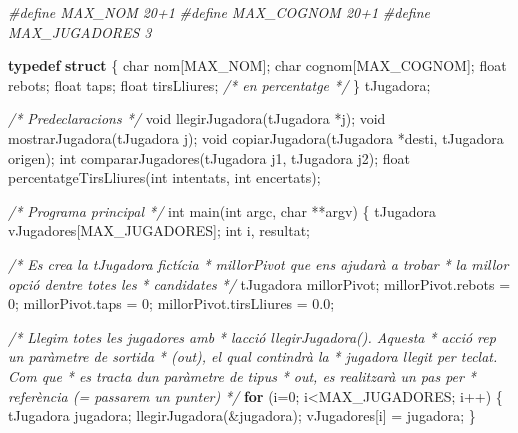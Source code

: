 \documentclass[]{book}
\newenvironment{Shaded}{\begin{snugshade}}{\end{snugshade}}
\newcommand{\CommentTok}[1]{\textcolor[rgb]{0.56,0.35,0.01}{\textit{#1}}}
\newcommand{\ControlFlowTok}[1]{\textcolor[rgb]{0.13,0.29,0.53}{\textbf{#1}}}
\newcommand{\DataTypeTok}[1]{\textcolor[rgb]{0.13,0.29,0.53}{#1}}
\newcommand{\DecValTok}[1]{\textcolor[rgb]{0.00,0.00,0.81}{#1}}
\newcommand{\FloatTok}[1]{\textcolor[rgb]{0.00,0.00,0.81}{#1}}
\newcommand{\KeywordTok}[1]{\textcolor[rgb]{0.13,0.29,0.53}{\textbf{#1}}}
\newcommand{\NormalTok}[1]{#1}
\newcommand{\PreprocessorTok}[1]{\textcolor[rgb]{0.56,0.35,0.01}{\textit{#1}}}
\begin{document}
\begin{Shaded}
\begin{Highlighting}[]
\PreprocessorTok{\#define MAX\_NOM 20+1}
\PreprocessorTok{\#define MAX\_COGNOM 20+1}
\PreprocessorTok{\#define MAX\_JUGADORES 3}

\KeywordTok{typedef} \KeywordTok{struct}\NormalTok{ \{}
    \DataTypeTok{char}\NormalTok{ nom[MAX\_NOM];}
    \DataTypeTok{char}\NormalTok{ cognom[MAX\_COGNOM];}
    \DataTypeTok{float}\NormalTok{ rebots;}
    \DataTypeTok{float}\NormalTok{ taps;}
    \DataTypeTok{float}\NormalTok{ tirsLliures; }\CommentTok{/* en percentatge */}
\NormalTok{\} tJugadora;}

\CommentTok{/* Predeclaracions */}
\DataTypeTok{void}\NormalTok{ llegirJugadora(tJugadora *j);}
\DataTypeTok{void}\NormalTok{ mostrarJugadora(tJugadora j);}
\DataTypeTok{void}\NormalTok{ copiarJugadora(tJugadora *desti, tJugadora origen);}
\DataTypeTok{int}\NormalTok{ compararJugadores(tJugadora j1, tJugadora j2);}
\DataTypeTok{float}\NormalTok{ percentatgeTirsLliures(}\DataTypeTok{int}\NormalTok{ intentats, }\DataTypeTok{int}\NormalTok{ encertats);}

\CommentTok{/* Programa principal */}
\DataTypeTok{int}\NormalTok{ main(}\DataTypeTok{int}\NormalTok{ argc, }\DataTypeTok{char}\NormalTok{ **argv) \{}
\NormalTok{    tJugadora vJugadores[MAX\_JUGADORES];}
    \DataTypeTok{int}\NormalTok{ i, resultat;}

    \CommentTok{/* Es crea la tJugadora fictícia }
\CommentTok{     * millorPivot que ens ajudarà a trobar }
\CommentTok{     * la millor opció d\textquotesingle{}entre totes les }
\CommentTok{     * candidates}
\CommentTok{     */}
\NormalTok{    tJugadora millorPivot;    }
\NormalTok{    millorPivot.rebots = }\DecValTok{0}\NormalTok{;}
\NormalTok{    millorPivot.taps = }\DecValTok{0}\NormalTok{;}
\NormalTok{    millorPivot.tirsLliures = }\FloatTok{0.0}\NormalTok{;}

    \CommentTok{/* Llegim totes les jugadores amb }
\CommentTok{     * l\textquotesingle{}acció llegirJugadora(). Aquesta}
\CommentTok{     * acció rep un paràmetre de sortida}
\CommentTok{     * (out), el qual contindrà la }
\CommentTok{     * jugadora llegit per teclat. Com que}
\CommentTok{     * es tracta d\textquotesingle{}un paràmetre de tipus }
\CommentTok{     * out, es realitzarà un pas per }
\CommentTok{     * referència (= passarem un punter)}
\CommentTok{     */}
    \ControlFlowTok{for}\NormalTok{ (i=}\DecValTok{0}\NormalTok{; i\textless{}MAX\_JUGADORES; i++) \{}
\NormalTok{        tJugadora jugadora;}
\NormalTok{        llegirJugadora(\&jugadora);}
\NormalTok{        vJugadores[i] = jugadora;}
\NormalTok{    \}}
    

\end{Highlighting}
\end{Shaded}
\end{document}
